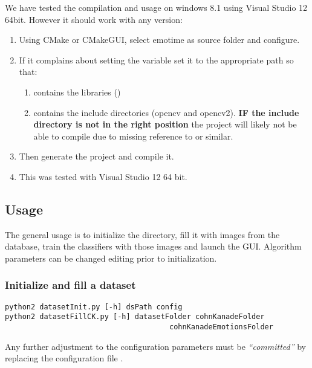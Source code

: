 We have tested the compilation and usage on windows 8.1 using Visual Studio 12
64bit. However it should work with any version:

\begin{enumerate}
  \item Using CMake or CMakeGUI, select emotime as source folder and configure.
  \item If it complains about setting the variable  set it to the appropriate path so that:
    \begin{enumerate}
      \item {} contains the libraries ()
      \item {} contains the include
        directories (opencv and opencv2). \textbf{IF the include directory is
        not in the right position} the project will likely not be able to
        compile due to missing reference to  or similar.
    \end{enumerate}
  \item Then generate the project and compile it.
  \item This was tested with Visual Studio 12 64 bit.
\end{enumerate}

\subsection{Usage}

The general usage is to initialize the  directory, fill it with
images from the  database, train the classifiers with those images and
launch the GUI\@. Algorithm parameters can be changed editing
 prior to initialization.

\subsubsection*{Initialize and fill a dataset}

\begin{verbatim}
python2 datasetInit.py [-h] dsPath config
python2 datasetFillCK.py [-h] datasetFolder cohnKanadeFolder
                                      cohnKanadeEmotionsFolder
\end{verbatim}

Any further adjustment to the configuration parameters must be
\emph{``committed''} by replacing the configuration file
.

